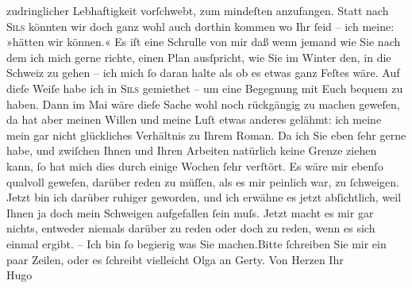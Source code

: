 \begin{ledgroupsized}[t]{13cm}
               zudringlicher Lebhaftigkeit vorſchwebt, zum mindeſten anzufangen. \hspace*{1.5em}Statt nach \textsc{Sils} könnten wir doch ganz wohl auch dorthin kommen wo {\pb}Ihr ſeid – ich meine: »hätten wir
               können.« Es iſt eine Schrulle von mir daß wenn jemand wie Sie nach dem ich mich gerne
               richte, einen Plan ausſpricht, wie Sie im Winter den, in die Schweiz zu gehen – ich mich ſo daran halte als ob es etwas ganz
               Feſtes wäre. Auf dieſe Weiſe habe ich in \textsc{Sils} gemiethet – um eine Begegnung mit Euch {\pb}bequem zu haben. Dann im
                  Mai wäre dieſe Sache wohl noch rückgängig zu machen geweſen, da hat
               aber meinen Willen und meine Luſt etwas anderes gelähmt: ich meine mein gar nicht
               glückliches Verhältnis zu Ihrem Roman. Da ich Sie eben ſehr gerne habe, und zwiſchen Ihnen und Ihren
               Arbeiten natürlich keine Grenze ziehen kann, ſo hat mich dies {\pb}durch einige Wochen ſehr verſtört.
               Es wäre mir ebenſo qualvoll geweſen, darüber reden zu müſſen, als es mir peinlich
               war,  zu ſchweigen.\pend
           \pstart
           Jetzt bin ich darüber ruhiger geworden, und ich erwähne es jetzt abſichtlich, weil
               Ihnen ja doch mein Schweigen aufgefallen ſein muſs.\pend
           \pstart
           Jetzt macht es mir gar nichts, {\pb}entweder niemals darüber zu reden oder doch zu reden, wenn es sich einmal
               ergibt.\pend
           \pstart
           \numberlinefalse{}–\numberlinetrue{}\pend
           \pstart
           Ich bin ſo begierig was Sie machen.\hspace*{1.5em}Bitte ſchreiben
               Sie mir ein paar Zeilen, oder es ſchreibt vielleicht Olga an Gerty.\pend
           \pstart
           Von Herzen Ihr{\\[\baselineskip]}\spacefill\mbox{Hugo}\pend

\end{ledgroupsized}
